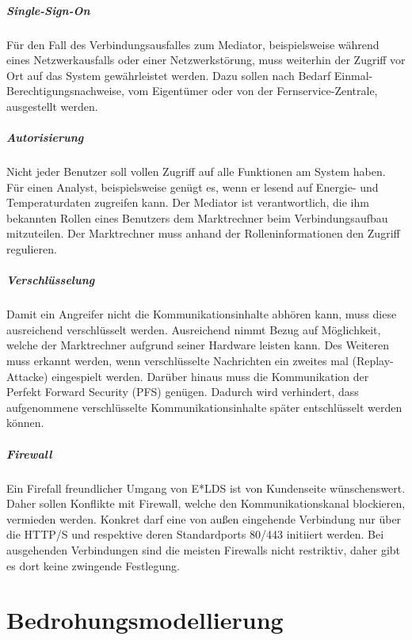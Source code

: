 \documentclass[11pt,a4paper]{report}
\begin{document}
\paragraph{Single-Sign-On}
Für den Fall des Verbindungsausfalles zum Mediator, beispielsweise während eines Netzwerkausfalls oder einer Netzwerkstörung, muss weiterhin der Zugriff vor Ort auf das System gewährleistet werden. Dazu sollen nach Bedarf Einmal-Berechtigungsnachweise, vom Eigentümer oder von der Fernservice-Zentrale, ausgestellt werden.

\paragraph{Autorisierung}
Nicht jeder Benutzer soll vollen Zugriff auf alle Funktionen am System haben. Für einen Analyst, beispielsweise genügt es, wenn er lesend auf Energie- und Temperaturdaten zugreifen kann. Der Mediator ist verantwortlich, die ihm bekannten Rollen eines Benutzers dem Marktrechner beim Verbindungsaufbau mitzuteilen. Der Marktrechner muss anhand der Rolleninformationen den Zugriff regulieren.

\paragraph{Verschlüsselung}
Damit ein Angreifer nicht die Kommunikationsinhalte abhören kann, muss diese ausreichend verschlüsselt werden. Ausreichend nimmt Bezug auf Möglichkeit, welche der Marktrechner aufgrund seiner Hardware leisten kann. Des Weiteren muss erkannt werden, wenn verschlüsselte Nachrichten ein zweites mal (Replay-Attacke) eingespielt werden. Darüber hinaus muss die Kommunikation der Perfekt Forward Security (PFS) genügen. Dadurch wird verhindert, dass aufgenommene verschlüsselte Kommunikationsinhalte später entschlüsselt werden können.

\paragraph{Firewall}
Ein Firefall freundlicher Umgang von E*LDS ist von Kundenseite wünschenswert. Daher sollen Konflikte mit Firewall, welche den Kommunikationskanal blockieren, vermieden werden. Konkret darf eine von außen eingehende Verbindung nur über die HTTP/S und respektive deren Standardports 80/443 initiiert werden. Bei ausgehenden Verbindungen sind die meisten Firewalls nicht restriktiv, daher gibt es dort keine zwingende Festlegung.

\chapter{Bedrohungsmodellierung} \label{chap:threat_modelling}
\end{document}
